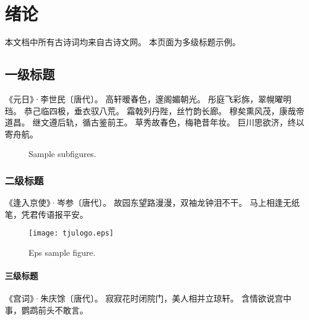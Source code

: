 \chapter{绪论}

本文档中所有古诗词均来自古诗文网\cite{poemonline}。
本页面为多级标题示例。

\section{一级标题}
\thispagestyle{fancy}   %

《元日》·李世民〔唐代〕。
高轩暧春色，邃阁媚朝光。
彤庭飞彩旆，翠幌曜明珰。
恭己临四极，垂衣驭八荒。
霜戟列丹陛，丝竹韵长廊。
穆矣熏风茂，康哉帝道昌。
继文遵后轨，循古鉴前王。
草秀故春色，梅艳昔年妆。
巨川思欲济，终以寄舟航。
\begin{figure}[!h]
    \centering
    \quad
    \caption{Sample subfigures.}
    \label{fig:my_label}
\end{figure}

\subsection{二级标题}

《逢入京使》·岑参〔唐代〕。
故园东望路漫漫，双袖龙钟泪不干。
马上相逢无纸笔，凭君传语报平安。
\begin{figure}[!h]
    \centering
    \texttt{[image: tjulogo.eps]}
    \caption{Eps sample figure.}
    \label{fig:my_label}
\end{figure}

\subsubsection{三级标题}

《宫词》·朱庆馀〔唐代〕。
寂寂花时闭院门，美人相并立琼轩。
含情欲说宫中事，鹦鹉前头不敢言。
\newpage